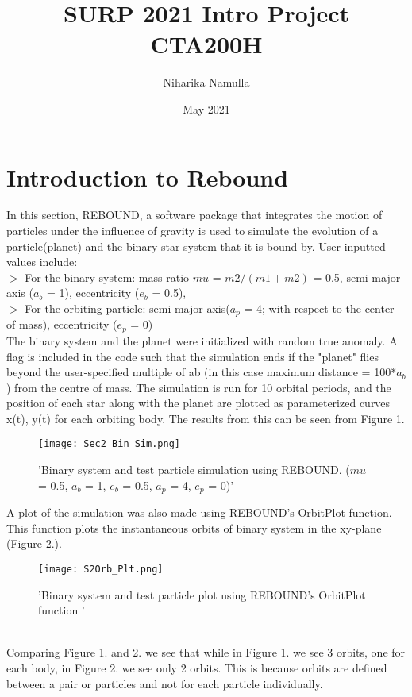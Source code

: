 \documentclass{article}
\title{SURP 2021 Intro Project CTA200H}
\author{Niharika Namulla}
\date{May 2021}
\begin{document}
\maketitle

\section{Introduction to Rebound}

In this section, REBOUND, a software package that integrates the motion of particles under the influence of gravity is used to simulate the evolution of a particle(planet) and the binary star system that it is bound by.
User inputted values include:
\\ $>$ For the binary system: mass ratio $mu$ = $m2/(m1+m2)$ = 0.5, semi-major axis ($a_b$ = 1), eccentricity ($e_b$ = 0.5), 
\\ $>$ For the orbiting particle: semi-major axis($a_p$ = 4; with respect to the center of mass), eccentricity ($e_p$ = 0)
\\ The binary system and the planet were initialized with random true anomaly. A flag is included in the code such that the simulation ends if the "planet" flies beyond the user-specified multiple of ab (in this case maximum distance = 100*$a_b$) from the centre of mass. 
The simulation is run for 10 orbital periods, and the position of each star along with the planet are plotted as parameterized curves x(t), y(t) for each orbiting body.
The results from this can be seen from Figure 1. 
\begin{figure}[htbp]
\texttt{[image: Sec2\_Bin\_Sim.png]}
\caption{'Binary system and test particle simulation using REBOUND. ($mu$ = 0.5, $a_b$ = 1, $e_b$ = 0.5, $a_p$ = 4, $e_p$ = 0)'}
\end{figure}

A plot of the simulation was also made using REBOUND's OrbitPlot function. This function plots the instantaneous orbits of binary system in the xy-plane (Figure 2.).

\begin{figure}[htbp]
\texttt{[image: S2Orb\_Plt.png]}
\caption{'Binary system and test particle plot using REBOUND's OrbitPlot function '}
\end{figure}

\\  Comparing Figure 1. and 2. we see that while in Figure 1. we see 3 orbits, one for each body, in Figure 2. we see only 2 orbits. This is because orbits are defined between a pair or particles and not for each particle individually.
\end{document}

